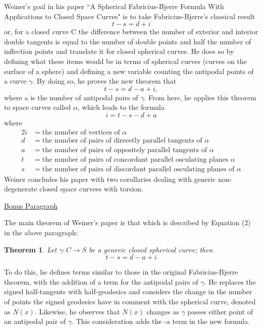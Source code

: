 \documentclass{article}
\begin{document}
Weiner's goal in his paper ``A Spherical Fabricius-Bjerre Formula With Applications to Closed Space Curves" 
is to take Fabricius-Bjerre's classical result 
\begin{equation}
t-s = d + i
\end{equation}
or, for a closed curve C the difference between the number of exterior and interior double tangents is equal to 
the number of double points and half the number of inflection points 
and translate it for closed spherical curves.
He does so by defining what these items would be in terms of spherical curves (curves on the surface of a sphere)
and defining a new variable counting the antipodal points of a curve $\gamma$.
By doing so, he proves the new theorem that
\begin{equation}
t - s = d - a + i,
\end{equation}
where a is the number of antipodal pairs of $\gamma$. 
From here, he applies this theorem to space curves called $\alpha$, which leads to the formula
\begin{equation}
i = t - s - d + a
\end{equation}
where
\begin{align*}
2i &= \textrm{the number of vertices of $\alpha$}\\
d &= \textrm{the number of pairs of direcetly parallel tangents of $\alpha$}\\
a &= \textrm{the number of pairs of oppositely parallel tangents of $\alpha$}\\
t &= \textrm{the number of pairs of concordant parallel osculating planes $\alpha$}\\
s &= \textrm{the number of pairs of discordant parallel osculating planes of $\alpha$}
\end{align*}
Weiner concludes his paper with two corollaries dealing with generic non-degenerate closed space curvees with torsion.
\newline

\underline{Bonus Paragraph}\newline

The main theorem of Weiner's paper is that which is described by Equation (2) in the above paragraph:
\newtheorem{weiner}{Theorem}
\begin{weiner}
Let $\gamma: C \to S$ be a generic closed spherical curve; then
\begin{equation*}
t - s = d - a + i
\end{equation*}
\end{weiner}
To do this, he defines terms similar to those in the original Fabricius-Bjerre theorem, with the addition of a term for the antipodal pairs of $\gamma$.
He replaces the signed half-tangents with half-geodesics and considers the change in the number of points the signed geodesics have in comment with the spherical curve, denoted as $N(x)$.
Likewise, he observes that $N(x)$ changes as $\gamma$ passes either point of an antipodal pair of $\gamma$. 
This consideration adds the -a term in the new formula.
\end{document}
